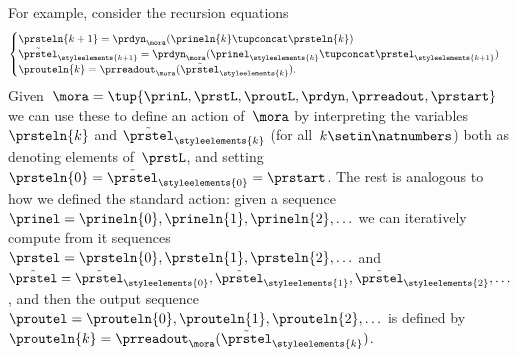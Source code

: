 For example, consider the recursion equations
\begin{equation}
    \label{eq:moore-new-recursion-equations}
    \begin{cases}
        \prsteln{k+1} = \prdyn_\mora(\prineln{k} \tupconcat \prsteln{k})                                                           \\
        \tilde{\prstel}_{\styleelements{k+1}} = \prdyn_\mora(\prinel_{\styleelements{k}} \tupconcat \prstel_{\styleelements{k+1}}) \\
        \prouteln{k} = \prreadout_\mora(\tilde{\prstel}_{\styleelements{k}}).
    \end{cases}
\end{equation}
Given~$\mora = \tup{\prinL,\prstL,\proutL,\prdyn,\prreadout,\prstart}$ we can use these to define an action of~$\mora$ by interpreting the variables~$\prsteln{k}$ and $\tilde{\prstel}_\styleelements{k}$ (for all~$k \setin \natnumbers$) both as denoting elements of~$\prstL$, and setting~$\prsteln{0} = \tilde{\prstel}_\styleelements{0} = \prstart$.
The rest is analogous to how we defined the standard action:
given a sequence~$\prinel = \prineln{0}, \prineln{1}, \prineln{2}, \ldots$ we can iteratively compute from it sequences~$\prstel = \prsteln{0}, \prsteln{1}, \prsteln{2}, \ldots$ and~$\tilde \prstel = \tilde{\prstel}_\styleelements{0}, \tilde{\prstel}_\styleelements{1}, \tilde{\prstel}_\styleelements{2}, \ldots$, and then the output sequence~$\proutel = \prouteln{0}, \prouteln{1}, \prouteln{2}, \ldots$ is defined by~$\prouteln{k} = \prreadout_\mora(\tilde{\prstel}_{\styleelements{k}})$.

